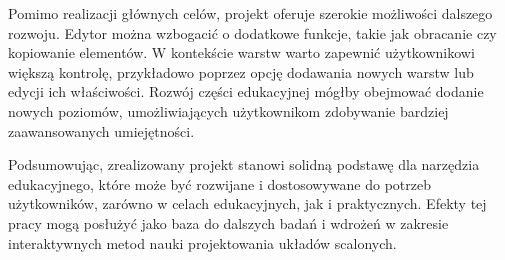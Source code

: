 Pomimo realizacji głównych celów,
projekt oferuje szerokie możliwości dalszego rozwoju.
Edytor można wzbogacić o dodatkowe funkcje,
takie jak obracanie czy kopiowanie elementów.
W kontekście warstw warto zapewnić użytkownikowi większą kontrolę,
przykładowo poprzez opcję dodawania nowych warstw lub edycji ich właściwości.
Rozwój części edukacyjnej mógłby obejmować dodanie nowych poziomów,
umożliwiających użytkownikom zdobywanie bardziej zaawansowanych umiejętności.


Podsumowując, zrealizowany projekt stanowi solidną podstawę dla narzędzia edukacyjnego,
które może być rozwijane i dostosowywane do potrzeb użytkowników, zarówno w celach edukacyjnych,
jak i praktycznych.
Efekty tej pracy mogą posłużyć jako baza do dalszych badań
i wdrożeń w zakresie interaktywnych metod nauki projektowania układów scalonych.

